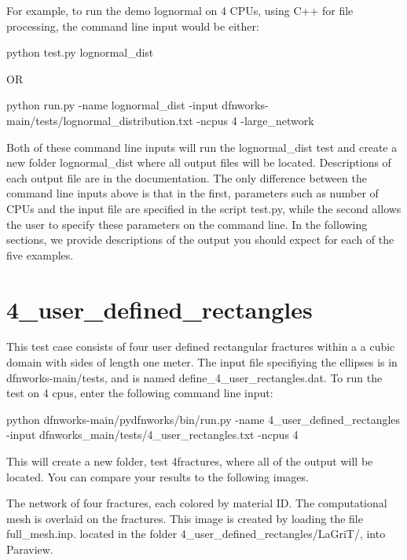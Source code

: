 \documentclass[letterpaper,10pt,english]{sphinxmanual}
\begin{document}
For example, to run the demo lognormal on 4 CPUs, using C++ for file processing,  the command line input would be either:

python test.py lognormal\_dist

OR

python run.py -name lognormal\_dist -input dfnworks-main/tests/lognormal\_distribution.txt -ncpus 4 -large\_network

Both of these command line inputs will run the lognormal\_dist test and create a new folder lognormal\_dist where all output files will be located. Descriptions of each output file are in the documentation. The only difference between the command line inputs above is that in the first, parameters such as number of CPUs and the input file are specified in the script test.py, while the second allows the user to specify these parameters on the command line. In the following sections, we provide descriptions of the output you should expect for each of the five examples.


\section{4\_user\_defined\_rectangles}
\label{examples:user-defined-rectangles}
This test case consists of four user defined rectangular fractures within a a cubic domain with sides of length one meter. The input file specifiying the ellipses is in dfnworks-main/tests, and is named define\_4\_user\_rectangles.dat. To run the test on 4 cpus, enter the following command line input:

python dfnworks-main/pydfnworks/bin/run.py -name 4\_user\_defined\_rectangles -input dfnworks\_main/tests/4\_user\_rectangles.txt -ncpus 4

This will create a new folder, test 4fractures, where all of the output will be located. You can compare your results to the following images.

The network of four fractures, each colored by material ID. The computational mesh is overlaid on the fractures. This image is created by loading the file full\_mesh.inp. located in the folder 4\_user\_defined\_rectangles/LaGriT/, into Paraview.

{\hfill{}\hfill}
\end{document}
